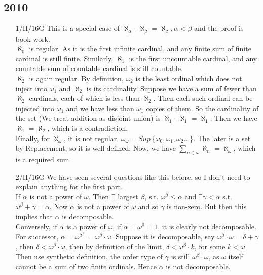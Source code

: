 \subsection{2010}
\begin{enumerate}
\item[1/II/16G] This is a special case of $\aleph_\alpha \cdot \aleph_\beta=\aleph_\beta, \alpha < \beta$ and the proof is book work.\\
    $\aleph_0$ is regular. As it is the first infinite cardinal, and any finite sum of finite cardinal is still finite. Similarly, $\aleph_1$ is the first uncountable cardinal, and any countable sum of countable cardinal is still countable.\\
    $\aleph_2$ is again regular. By definition, $\omega_2$ is the least ordinal which does not inject into $\omega_1$ and $\aleph_2$ is its cardinality. Suppose we have a sum of fewer than $\aleph_2$ cardinals, each of which is less than $\aleph_2$. Then each such ordinal can be injected into $\omega_1$ and we have less than $\omega_1$ copies of them. So the cardinality of the set (We treat addition as disjoint union) is $\aleph_1 \cdot \aleph_1 =\aleph_1$. Then we have $\aleph_1 =\aleph_2$, which is a contradiction.\\
    Finally, for $\aleph_\omega$, it is not regular. $\omega_\omega=Sup~\{\omega_0,\omega_1,\omega_2 \ldots\}$. The later is a set by Replacement, so it is well defined. Now, we have $\sum_{n \in \omega} \aleph_n =\aleph_\omega$, which is a required sum.\\
\item[2/II/16G] We have seen several questions like this before, so I don't need to explain anything for the first part.\\
    If $\alpha$ is not a power of $\omega$. Then $\exists$ largest $\beta$, s.t. $\omega^\beta \le \alpha$ and $\exists \gamma < \alpha$ s.t. $\omega^\beta+\gamma = \alpha$. Now $\alpha$ is not a power of $\omega$ and so $\gamma$ is non-zero. But then this implies that $\alpha$ is decomposable.\\
    Conversely, if $\alpha$ is a power of $\omega$, if $\alpha=\omega^0=1$, it is clearly not decomposable. For successor, $\alpha=\omega^{\beta^+}=\omega^\beta \cdot \omega$. Suppose it is decomposable, say $\omega^\beta \cdot \omega=\delta+\gamma$, then $\delta < \omega^\beta \cdot \omega$, then by definition of the limit, $\delta < \omega^\beta \cdot k$, for some $k<\omega$. Then use synthetic definition, the order type of $\gamma$ is still $\omega^\beta \cdot \omega$, as $\omega$ itself cannot be a sum of two finite ordinals. Hence $\alpha$ is not decomposable.

\end{enumerate}
